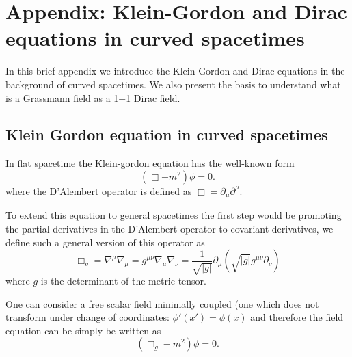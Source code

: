  

\chapter{Appendix: Klein-Gordon and Dirac equations in curved spacetimes}
\label{appB}

In this brief appendix we introduce the Klein-Gordon and Dirac equations in the background of curved spacetimes. We also present the basis to understand what is a Grassmann field as a 1+1 Dirac field.

\section{Klein Gordon equation in curved spacetimes}

In flat spacetime the Klein-gordon equation has the well-known form
\begin{equation}
(\Box-m^2) \phi =0.
\end{equation}
where the D'Alembert operator is defined as $\Box=\partial_\mu\partial^{\mu}$. 

To extend this equation to general spacetimes the first step would be promoting the partial derivatives in the D'Alembert operator to covariant derivatives, we define such a general version of this operator as
\begin{equation}
\Box_g=\nabla^\mu \nabla_\mu=g^{\mu\nu}\nabla_\mu\nabla_\nu=\frac{1}{\sqrt{|g|}}\partial_\mu\left(\sqrt{|g|}g^{\mu\nu}\partial_\nu\right)
\end{equation}
where $g$ is the determinant of the metric tensor.

One can consider a free scalar field minimally coupled (one which does not transform under change of coordinates: $\phi'(x')=\phi(x)$ and therefore the field equation can be simply be written as
\begin{equation}
(\Box_g-m^2) \phi =0.
\end{equation}

